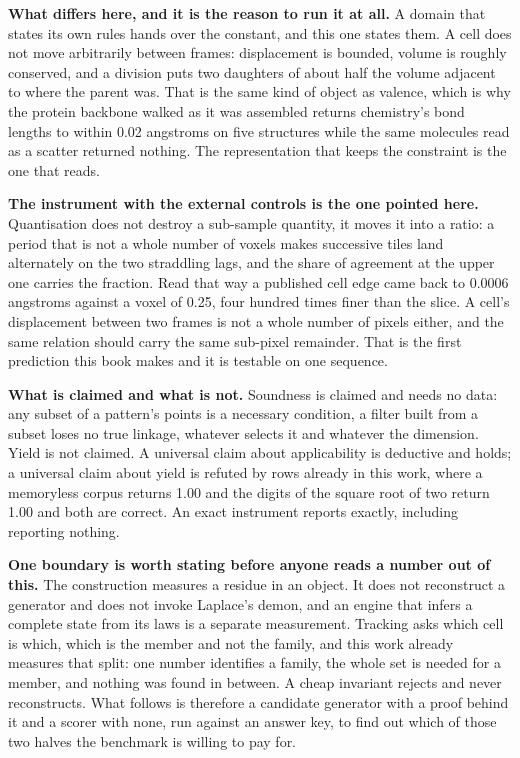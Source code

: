 \textbf{What differs here, and it is the reason to run it at all.} A domain that states its own rules
hands over the constant, and this one states them. A cell does not move arbitrarily between frames:
displacement is bounded, volume is roughly conserved, and a division puts two daughters of about half
the volume adjacent to where the parent was. That is the same kind of object as valence, which is why
the protein backbone walked as it was assembled returns chemistry's bond lengths to within 0.02
angstroms on five structures while the same molecules read as a scatter returned nothing. The
representation that keeps the constraint is the one that reads.

\textbf{The instrument with the external controls is the one pointed here.} Quantisation does not
destroy a sub-sample quantity, it moves it into a ratio: a period that is not a whole number of
voxels makes successive tiles land alternately on the two straddling lags, and the share of agreement
at the upper one carries the fraction. Read that way a published cell edge came back to 0.0006
angstroms against a voxel of 0.25, four hundred times finer than the slice. A cell's displacement
between two frames is not a whole number of pixels either, and the same relation should carry the
same sub-pixel remainder. That is the first prediction this book makes and it is testable on one
sequence.

\textbf{What is claimed and what is not.} Soundness is claimed and needs no data: any subset of a
pattern's points is a necessary condition, a filter built from a subset loses no true linkage,
whatever selects it and whatever the dimension. Yield is not claimed. A universal claim about
applicability is deductive and holds; a universal claim about yield is refuted by rows already in
this work, where a memoryless corpus returns 1.00 and the digits of the square root of two return
1.00 and both are correct. An exact instrument reports exactly, including reporting nothing.

\textbf{One boundary is worth stating before anyone reads a number out of this.} The construction
measures a residue in an object. It does not reconstruct a generator and does not invoke Laplace's
demon, and an engine that infers a complete state from its laws is a separate measurement. Tracking
asks which cell is which, which is the member and not the family, and this work already measures that
split: one number identifies a family, the whole set is needed for a member, and nothing was found in
between. A cheap invariant rejects and never reconstructs. What follows is therefore a candidate
generator with a proof behind it and a scorer with none, run against an answer key, to find out which
of those two halves the benchmark is willing to pay for.
